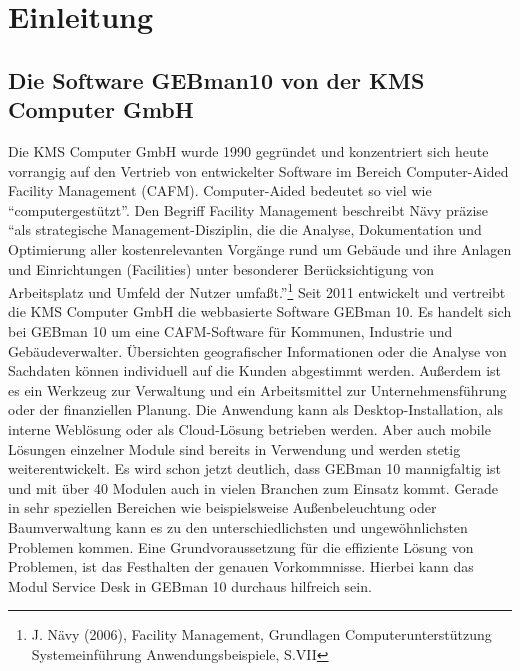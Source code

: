 \section{Einleitung}

\subsection{Die Software GEBman10 von der KMS Computer GmbH}
\noindent
Die KMS Computer GmbH wurde 1990 gegründet und konzentriert sich heute vorrangig auf den Vertrieb von entwickelter Software im Bereich Computer-Aided Facility Management (CAFM).
Computer-Aided bedeutet so viel wie \enquote{computergestützt}. Den Begriff Facility Management beschreibt Nävy präzise
\enquote{als strategische Management-Disziplin, die die Analyse, Dokumentation und Optimierung aller kostenrelevanten Vorgänge rund um Gebäude und ihre Anlagen und Einrichtungen (Facilities) unter besonderer Berücksichtigung von Arbeitsplatz und Umfeld der Nutzer umfaßt.}\footnote{J. Nävy (2006), Facility Management, Grundlagen Computerunterstützung Systemeinführung Anwendungsbeispiele, S.VII}
\noindent
Seit 2011 entwickelt und vertreibt die KMS Computer GmbH die webbasierte Software GEBman 10. Es handelt sich bei GEBman 10 um eine CAFM-Software für Kommunen, Industrie und Gebäudeverwalter. Übersichten geografischer Informationen oder die Analyse von Sachdaten können individuell auf die Kunden abgestimmt werden. Außerdem ist es ein Werkzeug zur Verwaltung und ein Arbeitsmittel zur Unternehmensführung oder der finanziellen Planung. Die Anwendung kann als Desktop-Installation, als interne Weblösung oder als Cloud-Lösung betrieben werden. Aber auch mobile Lösungen einzelner Module sind bereits in Verwendung und werden stetig weiterentwickelt. Es wird schon jetzt deutlich, dass GEBman 10 mannigfaltig ist und mit über 40 Modulen auch in vielen Branchen zum Einsatz kommt.
Gerade in sehr speziellen Bereichen wie beispielsweise Außenbeleuchtung oder Baumverwaltung kann es zu den unterschiedlichsten und ungewöhnlichsten Problemen kommen. Eine Grundvoraussetzung  für die effiziente Lösung von Problemen, ist das Festhalten der genauen Vorkommnisse. Hierbei kann das Modul Service Desk in GEBman 10 durchaus hilfreich sein.



